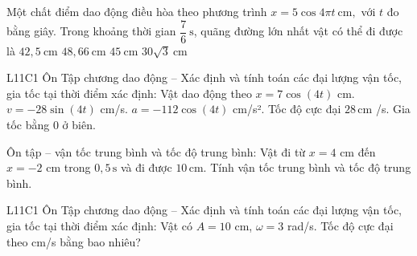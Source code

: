 \begin{ex}
Một chất điểm dao động điều hòa theo phương trình
$x=5\cos 4\pi t\ \text{cm},$
với $t$ đo bằng giây. Trong khoảng thời gian $\dfrac{7}{6}\ \text{s}$, quãng đường lớn nhất vật có thể đi được là
\choice
{$42,5\ \text{cm}$}
{\True $48,66\ \text{cm}$}
{$45\ \text{cm}$}
{$30\sqrt{3}\ \text{cm}$}
\end{ex}

\begin{ex}
L11C1 Ôn Tập chương dao động – Xác định và tính toán các đại lượng vận tốc, gia tốc tại thời điểm xác định: Vật dao động theo $x=7\cos(4t)$ cm.
\choiceTF
{\True $v=-28\sin(4t)$ cm/s.}
{\True $a=-112\cos(4t)$ cm/s².}
{\True Tốc độ cực đại $28\,\text{cm}$ /s.}
{Gia tốc bằng 0 ở biên.}
\end{ex}

\begin{ex}
Ôn tập – vận tốc trung bình và tốc độ trung bình: Vật đi từ $x=4$ cm đến $x=-2$ cm trong $0,5\,\text{s}$ và đi được $10\,\text{cm}$. Tính vận tốc trung bình và tốc độ trung bình.
\choiceTF

\end{ex}

\begin{ex}
L11C1 Ôn Tập chương dao động – Xác định và tính toán các đại lượng vận tốc, gia tốc tại thời điểm xác định: Vật có $A=10$ cm, $\omega=3$ rad/s. Tốc độ cực đại theo cm/s bằng bao nhiêu?
\end{ex}


